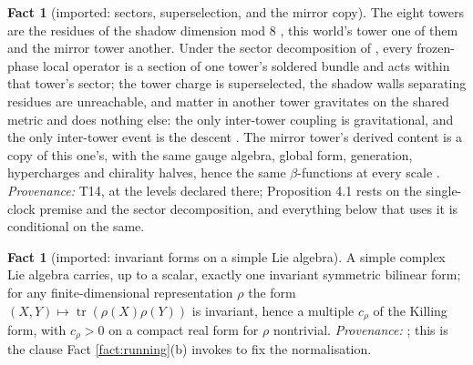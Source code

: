 \documentclass[11pt]{article}
\theoremstyle{definition}
\newtheorem{fact}[theorem]{Fact}
\newcommand{\tr}{\operatorname{tr}}
\begin{document}
\begin{fact}[imported: sectors, superselection, and the mirror copy]\label{fact:towers}
The eight towers are the residues of the shadow dimension mod $8$ \cite[Prop.~3.1]{ButlerT14}, this world's tower one of them and the mirror tower another. Under the sector decomposition of \cite[Def.~3.6]{ButlerT14}, every frozen-phase local operator is a section of one tower's soldered bundle and acts within that tower's sector; the tower charge is superselected, the shadow walls separating residues are unreachable, and matter in another tower gravitates on the shared metric and does nothing else: the only inter-tower coupling is gravitational, and the only inter-tower event is the descent \cite[Prop.~4.1]{ButlerT14}. The mirror tower's derived content is a copy of this one's, with the same gauge algebra, global form, generation, hypercharges and chirality halves, hence the same $\beta$-functions at every scale \cite[Thm.~4.3(i),(iii)]{ButlerT14}. \emph{Provenance:} T14, at the levels declared there; Proposition 4.1 rests on the single-clock premise and the sector decomposition, and everything below that uses it is conditional on the same.
\end{fact}

\begin{fact}[imported: invariant forms on a simple Lie algebra]\label{fact:killing}
A simple complex Lie algebra carries, up to a scalar, exactly one invariant symmetric bilinear form; for any finite-dimensional representation $\rho$ the form $(X, Y) \mapsto \tr(\rho(X)\rho(Y))$ is invariant, hence a multiple $c_{\rho}$ of the Killing form, with $c_{\rho} > 0$ on a compact real form for $\rho$ nontrivial. \emph{Provenance:} \cite[Ch.~14, App.~C]{FultonHarris1991}; this is the clause Fact \ref{fact:running}(b) invokes to fix the normalisation.
\end{fact}
\end{document}
